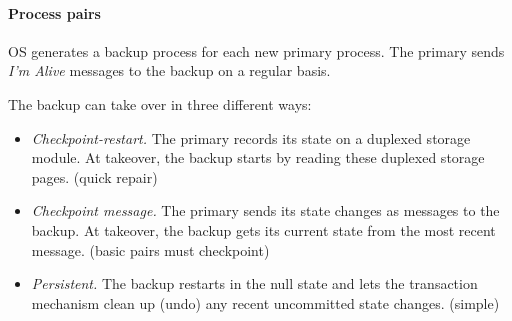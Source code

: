 \paragraph{Process pairs} OS generates a backup process for each new primary process. The primary sends \textit{I'm Alive} messages to the backup on a regular basis.

The backup can take over in three different ways:
\begin{itemize}
  \item \textit{Checkpoint-restart.} The primary records its state on a duplexed storage module. At takeover, the backup starts by reading these duplexed storage pages. (quick repair)
  \item \textit{Checkpoint message.} The primary sends its state changes as messages to the backup. At takeover, the backup gets its current state from the most recent message. (basic pairs must checkpoint)
  \item \textit{Persistent.} The backup restarts in the null state and lets the transaction mechanism clean up (undo) any recent uncommitted state changes. (simple)
\end{itemize}



